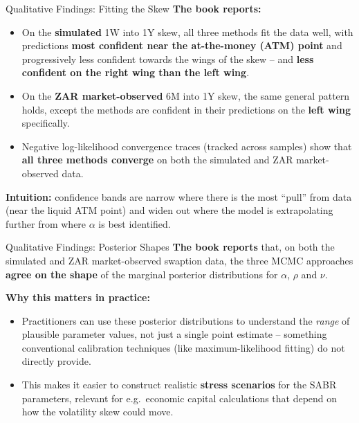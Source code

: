 \documentclass[aspectratio=169,10pt]{beamer}
\begin{document}
\begin{frame}{Qualitative Findings: Fitting the Skew}
  \textbf{The book reports:}
  \begin{itemize}
    \item On the \textbf{simulated} 1W into 1Y skew, all three methods fit
      the data well, with predictions \textbf{most confident near the
      at-the-money (ATM) point} and progressively less confident towards the
      wings of the skew -- and \textbf{less confident on the right wing than
      the left wing}.
    \item On the \textbf{ZAR market-observed} 6M into 1Y skew, the same
      general pattern holds, except the methods are confident in their
      predictions on the \textbf{left wing} specifically.
    \item Negative log-likelihood convergence traces (tracked across
      samples) show that \textbf{all three methods converge} on both the
      simulated and ZAR market-observed data.
  \end{itemize}
  \vspace{2mm}
  \textbf{Intuition:} confidence bands are narrow where there is the most
  ``pull'' from data (near the liquid ATM point) and widen out where the
  model is extrapolating further from where $\alpha$ is best identified.
\end{frame}

\begin{frame}{Qualitative Findings: Posterior Shapes}
  \textbf{The book reports} that, on both the simulated and ZAR
  market-observed swaption data, the three MCMC approaches \textbf{agree on
  the shape} of the marginal posterior distributions for $\alpha$, $\rho$
  and $\nu$.

  \vspace{2mm}
  \textbf{Why this matters in practice:}
  \begin{itemize}
    \item Practitioners can use these posterior distributions to understand
      the \emph{range} of plausible parameter values, not just a single
      point estimate -- something conventional calibration techniques (like
      maximum-likelihood fitting) do not directly provide.
    \item This makes it easier to construct realistic \textbf{stress
      scenarios} for the SABR parameters, relevant for e.g.\ economic capital
      calculations that depend on how the volatility skew could move.
  \end{itemize}
\end{frame}
\end{document}
